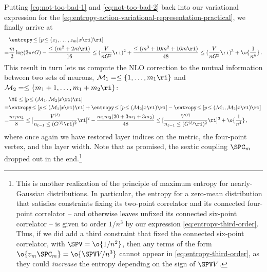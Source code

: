 Putting \eqref{eq:not-too-bad-1} and \eqref{eq:not-too-bad-2} back into our variational expression for the  \eqref{eq:entropy-action-variational-representation-practical}, we finally arrive at
\begin{align}\label{eq:entropy-third-order}
&\entropy\!\le[p\!\le(z_1,\ldots, z_{m}\vert x\ri)\ri]\\
=&\frac{m}{2}\log(2\pi e G)-\frac{\le(m^2+2m\ri)}{16}\le(\frac{V}{n G^2 }\ri)^2+\frac{\le(m^3+10m^2+16m\ri)}{48}\le(\frac{V}{n G^2 }\ri)^3+\o{\frac{1}{n^4}}\, .\notag
\end{align}
This result 
in turn lets us compute the NLO correction to the mutual information between two sets of neurons, $\mathcal{M}_1=\le\{1,\ldots,m_1\ri\}$ and $\mathcal{M}_2=\le\{m_1+1,\ldots,m_1+m_2\ri\}$:
\begin{align}\label{eq:MIT-third-order}
&\MI\le[p\!\le( \mathcal{M}_1 , \mathcal{M}_2 \vert x\ri)\ri] \, \\
\equiv&\entropy\!\le[p\!\le(\mathcal{M}_1 \vert x\ri)\ri]+\entropy\!\le[p\!\le(\mathcal{M}_2 \vert x\ri)\ri]-\entropy\!\le[p\!\le(\mathcal{M}_1 , \mathcal{M}_2 \vert x\ri)\ri]\, \notag \\
=&\frac{m_1m_2}{8}\le[\frac{ V^{(\ell)} }{ n_{\ell-1} \le(G^{(\ell)}\ri)^2} \ri]^2 -\frac{m_1 m_2(20+3m_1+3m_2)}{48}\le[\frac{ V^{(\ell)} }{ n_{\ell-1} \le(G^{(\ell)}\ri)^2} \ri]^3 +\o{\frac{1}{n^4}} \, \notag,
\end{align}
where once again we have restored  layer indices on the metric, the four-point vertex, and the layer width.
Note that as promised, the sextic coupling $\SPC_m$ dropped out in the end.\footnote{
This is another realization of the principle of maximum entropy for nearly-Gaussian distributions. 
In particular, the entropy for a zero-mean distribution that satisfies constraints 
fixing its two-point correlator and its connected four-point correlator -- and otherwise leaves unfixed its connected six-point correlator -- 
is given to order $1/n^3$ by our expression \eqref{eq:entropy-third-order}. Thus, if we did add a third constraint that fixed the connected six-point correlator, with $\SPV = \o{1/n^2}$, then any terms of the form $\o{v_m \SPC_m } = \o{\SPV V/n^3}$ cannot appear in \eqref{eq:entropy-third-order}, as they could \emph{increase} the entropy depending on the sign of $\SPV V$.
} 


